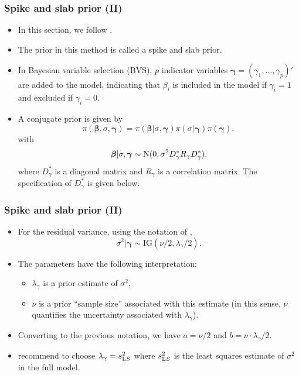 \documentclass[xcolor=table,10pt]{beamer}
\begin{document}
\begin{frame}
  \frametitle{Spike and slab prior (II)}
  \begin{itemize}
  \item In this section, we follow \citep{George1997}.
  \item The prior in this method is called a \alert{spike and slab
      prior}.
  \item In Bayesian variable selection (BVS), $p$ indicator
    variables $\bm\gamma = (\gamma_1, \ldots, \gamma_p)'$ are added to 
    the model, indicating that $\beta_i$ is included in the model if
    $\gamma_i=1$ and excluded if $\gamma_i=0$.
  \item A conjugate prior is given by
    \begin{equation*}
      \pi(\bm\beta, \sigma, \bm\gamma) = \pi(\bm\beta|\sigma, \bm\gamma)\pi
      (\sigma|\bm\gamma) \pi(\bm\gamma),
    \end{equation*}
    with
    \begin{equation*}
      \bm\beta | \sigma,\bm\gamma \sim {\rm N}(0,\sigma^2 D^\ast_\gamma
      R_\gamma D^\ast_\gamma), 
    \end{equation*}
    where $D^\ast_\gamma$ is a diagonal matrix and $R_\gamma$ is a
    correlation matrix. The specification of $D^\ast_\gamma$ is given
    below.
  \end{itemize}
\end{frame}

\begin{frame}
  \frametitle{Spike and slab prior (II)}
  \begin{itemize}
  \item For the residual variance, using the notation of
    \citep{George1997},
    \begin{equation*}
      \sigma^2|\bm \gamma \sim \text{IG}(\nu/2, \lambda_\gamma/2). 
    \end{equation*}
    \vspace*{-\baselineskip}
  \item The parameters have the following interpretation:
    \begin{itemize}
      \addtolength{\itemsep}{2pt}
    \item $\lambda_\gamma$ is a prior estimate of $\sigma^2$,
      \item $\nu$
      is a prior ``sample size'' associated with this estimate (in
      this sense, $\nu$ quantifies the uncertainty associated with
      $\lambda_\gamma$).
    \end{itemize}
  \item Converting to the previous notation, we have $a=\nu/2$ and
    $b=\nu\cdot \lambda_\gamma/2$.
  \item \citep{George1997} recommend to choose
    $\lambda_\gamma=s^2_{\text LS}$ where $s^2_{\text LS}$ is the
    least squares estimate of $\sigma^2$ in the full model.
  \end{itemize}
\end{frame}
\end{document}
